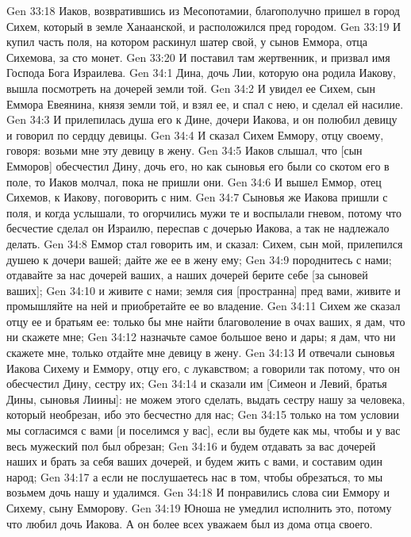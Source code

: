 \vs Gen 33:18 Иаков, возвратившись из Месопотамии, благополучно пришел в город Сихем, который в земле Ханаанской, и расположился пред городом.
\vs Gen 33:19 И купил часть поля, на котором раскинул шатер свой, у сынов Еммора, отца Сихемова, за сто монет.
\vs Gen 33:20 И поставил там жертвенник, и призвал имя Господа Бога Израилева.
\vs Gen 34:1 Дина, дочь Лии, которую она родила Иакову, вышла посмотреть на дочерей земли той.
\vs Gen 34:2 И увидел ее Сихем, сын Еммора Евеянина, князя земли той, и взял ее, и спал с нею, и сделал ей насилие.
\vs Gen 34:3 И прилепилась душа его к Дине, дочери Иакова, и он полюбил девицу и говорил по сердцу девицы.
\vs Gen 34:4 И сказал Сихем Еммору, отцу своему, говоря: возьми мне эту девицу в жену.
\vs Gen 34:5 Иаков слышал, что [сын Емморов] обесчестил Дину, дочь его, но как сыновья его были со скотом его в поле, то Иаков молчал, пока не пришли они.
\vs Gen 34:6 И вышел Еммор, отец Сихемов, к Иакову, поговорить с ним.
\vs Gen 34:7 Сыновья же Иакова пришли с поля, и когда услышали, то огорчились мужи те и воспылали гневом, потому что бесчестие сделал он Израилю, переспав с дочерью Иакова, а так не надлежало делать.
\vs Gen 34:8 Еммор стал говорить им, и сказал: Сихем, сын мой, прилепился душею к дочери вашей; дайте же ее в жену ему;
\vs Gen 34:9 породнитесь с нами; отдавайте за нас дочерей ваших, а наших дочерей берите себе [за сыновей ваших];
\vs Gen 34:10 и живите с нами; земля сия [пространна] пред вами, живите и промышляйте на ней и приобретайте ее во владение.
\vs Gen 34:11 Сихем же сказал отцу ее и братьям ее: только бы мне найти благоволение в очах ваших, я дам, что ни скажете мне;
\vs Gen 34:12 назначьте самое большое вено и дары; я дам, что ни скажете мне, только отдайте мне девицу в жену.
\vs Gen 34:13 И отвечали сыновья Иакова Сихему и Еммору, отцу его, с лукавством; а говорили так потому, что он обесчестил Дину, сестру их;
\vs Gen 34:14 и сказали им [Симеон и Левий, братья Дины, сыновья Лиины]: не можем этого сделать, выдать сестру нашу за человека, который необрезан, ибо это бесчестно для нас;
\vs Gen 34:15 только на том условии мы согласимся с вами [и поселимся у вас], если вы будете как мы, чтобы и у вас весь мужеский пол был обрезан;
\vs Gen 34:16 и будем отдавать за вас дочерей наших и брать за себя ваших дочерей, и будем жить с вами, и составим один народ;
\vs Gen 34:17 а если не послушаетесь нас в том, чтобы обрезаться, то мы возьмем дочь нашу и удалимся.
\vs Gen 34:18 И понравились слова сии Еммору и Сихему, сыну Емморову.
\vs Gen 34:19 Юноша не умедлил исполнить это, потому что любил дочь Иакова. А он более всех уважаем был из дома отца своего.
